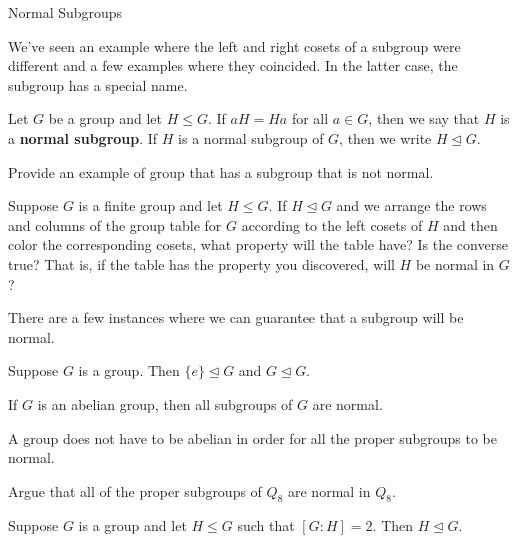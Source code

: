 \begin{section}{Normal Subgroups}

We've seen an example where the left and right cosets of a subgroup were different and a few examples where they coincided.  In the latter case, the subgroup has a special name.

\begin{definition}
Let $G$ be a group and let $H\leq G$.  If $aH=Ha$ for all $a\in G$, then we say that $H$ is a \textbf{normal subgroup}.  If $H$ is a normal subgroup of $G$, then we write $H\trianglelefteq G$.
\end{definition}

\begin{problem}
Provide an example of group that has a subgroup that is not normal.
\end{problem}

\begin{problem}\label{prob:checkerboard}
Suppose $G$ is a finite group and let $H\leq G$.  If $H\trianglelefteq G$ and we arrange the rows and columns of the group table for $G$ according to the left cosets of $H$ and then color the corresponding cosets, what property will the table have?  Is the converse true?  That is, if the table has the property you discovered, will $H$ be normal in $G$?
\end{problem}

There are a few instances where we can guarantee that a subgroup will be normal.

\begin{theorem}
Suppose $G$ is a group.  Then $\{e\}\trianglelefteq G$ and $G\trianglelefteq G$.
\end{theorem}

\begin{theorem}
If $G$ is an abelian group, then all subgroups of $G$ are normal.
\end{theorem}

A group does not have to be abelian in order for all the proper subgroups to be normal.

\begin{problem}
Argue that all of the proper subgroups of $Q_8$ are normal in $Q_8$. 
\end{problem}

\begin{theorem}\label{thm:index2}
Suppose $G$ is a group and let $H\leq G$ such that $[G:H]=2$.  Then $H\trianglelefteq G$.
\end{theorem}


\end{section}
